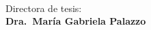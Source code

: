 \usepackage{etoolbox}
\makeatletter
\patchcmd{\maketitle}
  {\@author}
  {\@author\\[0.8em]
   {\normalsize\normalfont
    Directora de tesis:\\[0.2em]
    \textbf{Dra.~María Gabriela Palazzo}}}
  {}{}
\makeatother
